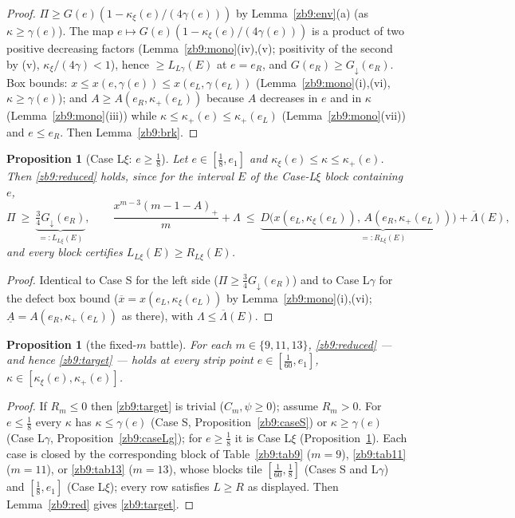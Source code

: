 \documentclass[11pt]{article}
\newtheorem{proposition}[lemma]{Proposition}
\theoremstyle{remark}
\newcommand{\kxi}{\kappa_\xi}
\newcommand{\khi}{\kappa_{+}}
\begin{document}
\begin{proof}
$\Pi\ge G(e)(1-\kxi(e)/(4\gamma(e)))$ by Lemma~\ref{zb9:env}(a) (as
$\kappa\ge\gamma(e)$).  The map $e\mapsto G(e)(1-\kxi(e)/(4\gamma(e)))$ is a
product of two positive decreasing factors (Lemma~\ref{zb9:mono}(iv),(v);
positivity of the second by (v), $\kxi/(4\gamma)<1$), hence
$\ge L_{L\gamma}(E)$ at $e=e_R$, and $G(e_R)\ge G_\downarrow(e_R)$.  Box
bounds: $x\le x(e,\gamma(e))\le x(e_L,\gamma(e_L))$
(Lemma~\ref{zb9:mono}(i),(vi), $\kappa\ge\gamma(e)$); and $A\ge
A(e_R,\khi(e_L))$ because $A$ decreases in $e$ and in $\kappa$
(Lemma~\ref{zb9:mono}(iii)) while $\kappa\le\khi(e)\le\khi(e_L)$
(Lemma~\ref{zb9:mono}(vii)) and $e\le e_R$.  Then Lemma~\ref{zb9:brk}.
\end{proof}

\begin{proposition}[Case L$\xi$: $e\ge\tfrac18$]\label{zb9:caseLx}
Let $e\in[\tfrac18,e_1]$ and $\kxi(e)\le\kappa\le\khi(e)$.  Then
\eqref{zb9:reduced} holds, since for the interval $E$ of the Case-L$\xi$
block containing $e$,
\[
        \Pi\ \ge\ \underbrace{\tfrac34 G_\downarrow(e_R)}_{=:L_{L\xi}(E)},
        \qquad
        \frac{x^{m-3}(m-1-A)_+}{m}+\Lambda\ \le\
        \underbrace{D\bigl(x(e_L,\kxi(e_L)),\,A(e_R,\khi(e_L))\bigr)
        +\overline\Lambda(E)}_{=:R_{L\xi}(E)},
\]
and every block certifies $L_{L\xi}(E)\ge R_{L\xi}(E)$.
\end{proposition}

\begin{proof}
Identical to Case S for the left side ($\Pi\ge\tfrac34G_\downarrow(e_R)$) and
to Case L$\gamma$ for the defect box bound
($\overline x=x(e_L,\kxi(e_L))$ by Lemma~\ref{zb9:mono}(i),(vi);
$\underline A=A(e_R,\khi(e_L))$ as there), with $\Lambda\le\overline\Lambda(E)$.
\end{proof}

\begin{proposition}[the fixed-$m$ battle]\label{zb9:battle}
For each $m\in\{9,11,13\}$, \eqref{zb9:reduced} --- and hence
\eqref{zb9:target} --- holds at every strip point
$e\in[\tfrac1{60},e_1]$, $\kappa\in[\kxi(e),\khi(e)]$.
\end{proposition}

\begin{proof}
If $R_m\le0$ then \eqref{zb9:target} is trivial ($C_m,\psi\ge0$); assume
$R_m>0$.  For $e\le\tfrac18$ every $\kappa$ has $\kappa\le\gamma(e)$
(Case S, Proposition~\ref{zb9:caseS}) or $\kappa\ge\gamma(e)$
(Case L$\gamma$, Proposition~\ref{zb9:caseLg}); for $e\ge\tfrac18$ it is
Case L$\xi$ (Proposition~\ref{zb9:caseLx}).  Each case is closed by the
corresponding block of Table~\ref{zb9:tab9} ($m=9$), \ref{zb9:tab11}
($m=11$), or \ref{zb9:tab13} ($m=13$), whose blocks tile
$[\tfrac1{60},\tfrac18]$ (Cases S and L$\gamma$) and $[\tfrac18,e_1]$
(Case L$\xi$); every row satisfies $L\ge R$ as displayed.  Then
Lemma~\ref{zb9:red} gives \eqref{zb9:target}.
\end{proof}
\end{document}
